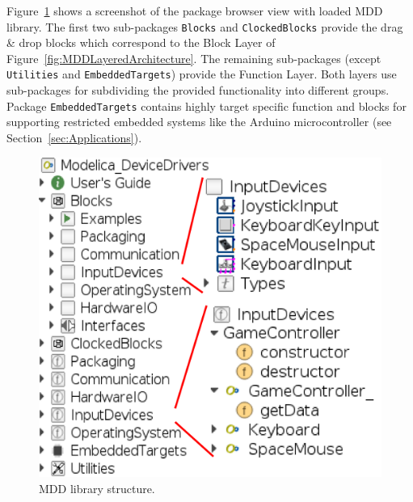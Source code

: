 \documentclass{resources/modelica}
\newcommand{\modelica}[1]{\lstinline[language=modelica]|#1|}
\begin{document}
Figure~\ref{fig:MDDPackageBrowseScreenshot} shows a screenshot of the package
browser view with loaded MDD library. The first two sub-packages
\modelica{Blocks} and \modelica{ClockedBlocks} provide the drag \& drop blocks
which correspond to the \textsf{Block Layer} of
Figure~\ref{fig:MDDLayeredArchitecture}. The remaining sub-packages (except
\modelica{Utilities} and \modelica{EmbeddedTargets}) provide the
\textsf{Function Layer}.
Both layers use sub-packages for subdividing the provided functionality into
different groups. Package \modelica{EmbeddedTargets} contains highly
target specific function and blocks for supporting restricted
embedded systems like the Arduino microcontroller (see
Section~\ref{sec:Applications}).

\begin{figure}[h]
  \centering
  \includegraphics[width=\columnwidth]{figures/MDDPackageBrowseScreenshot}
  \caption{MDD library structure.}
  \label{fig:MDDPackageBrowseScreenshot}
\end{figure}
\end{document}
